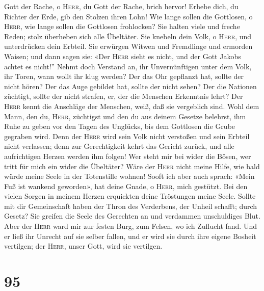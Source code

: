  Gott der Rache, o \textsc{Herr}, du Gott der Rache, brich
hervor!  Erhebe dich, du Richter der Erde, gib den Stolzen
ihren Lohn!  Wie lange sollen die Gottlosen, o
\textsc{Herr}, wie lange sollen die Gottlosen frohlocken? 
Sie halten viele und freche Reden; stolz überheben sich alle Übeltäter.
 Sie knebeln dein Volk, o \textsc{Herr}, und unterdrücken
dein Erbteil.  Sie erwürgen Witwen und Fremdlinge und
ermorden Waisen;  und dann sagen sie: «Der \textsc{Herr}
sieht es nicht, und der Gott Jakobs achtet es nicht!'' 
Nehmt doch Verstand an, ihr Unvernünftigen unter dem Volk, ihr Toren,
wann wollt ihr klug werden?  Der das Ohr gepflanzt hat,
sollte der nicht hören? Der das Auge gebildet hat, sollte der nicht
sehen?  Der die Nationen züchtigt, sollte der nicht
strafen, er, der die Menschen Erkenntnis lehrt?  Der
\textsc{Herr} kennt die Anschläge der Menschen, weiß, daß sie vergeblich
sind.  Wohl dem Mann, den du, \textsc{Herr}, züchtigst
und den du aus deinem Gesetze belehrst,  ihm Ruhe zu
geben vor den Tagen des Unglücks, bis dem Gottlosen die Grube gegraben
wird.  Denn der \textsc{Herr} wird sein Volk nicht
verstoßen und sein Erbteil nicht verlassen;  denn zur
Gerechtigkeit kehrt das Gericht zurück, und alle aufrichtigen Herzen
werden ihm folgen!  Wer steht mir bei wider die Bösen,
wer tritt für mich ein wider die Übeltäter?  Wäre der
\textsc{Herr} nicht meine Hilfe, wie bald würde meine Seele in der
Totenstille wohnen!  Sooft ich aber auch sprach: «Mein
Fuß ist wankend geworden», hat deine Gnade, o \textsc{Herr}, mich
gestützt.  Bei den vielen Sorgen in meinem Herzen
erquickten deine Tröstungen meine Seele.  Sollte mit dir
Gemeinschaft haben der Thron des Verderbens, der Unheil schafft; durch
Gesetz?  Sie greifen die Seele des Gerechten an und
verdammen unschuldiges Blut.  Aber der \textsc{Herr} ward
mir zur festen Burg, zum Felsen, wo ich Zuflucht fand. 
Und er ließ ihr Unrecht auf sie selber fallen, und er wird sie durch
ihre eigene Bosheit vertilgen; der \textsc{Herr}, unser Gott, wird sie
vertilgen.

\hypertarget{section-94}{%
\section{95}\label{section-94}}

